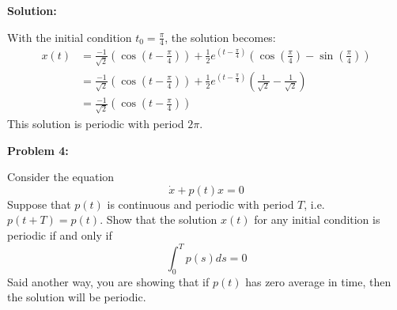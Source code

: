 \documentclass[12pt]{article}
\newenvironment{problem}[1]{
    \textbf{Problem #1:}
}{
    \rmfamily \vspace{1em}
}
\newenvironment{solution}{
    \textbf{Solution:}
    
}{
    
    \vspace{2em}
}
\begin{document}
\begin{solution}
\[    \]
With the initial condition \(t_0 = \frac{\pi}{4}\), the solution becomes:
    \[
        \begin{aligned}
            x(t) &= \frac{-1}{\sqrt{2}} \left(\cos(t-\frac{\pi}{4})\right) + \frac{1}{2}e^{(t-\frac{\pi}{4})} \left(\cos(\frac{\pi}{4})-\sin(\frac{\pi}{4})\right)\\
            &= \frac{-1}{\sqrt{2}} \left(\cos(t-\frac{\pi}{4})\right) + \frac{1}{2}e^{(t-\frac{\pi}{4})} \left(\frac{1}{\sqrt{2}}-\frac{1}{\sqrt{2}}\right)\\
            &= \frac{-1}{\sqrt{2}} \left(\cos(t-\frac{\pi}{4})\right)
        \end{aligned}
    \]
This solution is periodic with period \(2\pi\).
\end{solution}

\begin{problem}{4}
    Consider the equation
        \[
            \dot{x} + p(t)x = 0
        \]
    Suppose that \(p(t)\) is continuous  and periodic with period \(T\), i.e. \(p(t + T) = p(t)\). Show that the solution \(x(t)\) for any initial condition is
    periodic if and only if
    \[
        \int_{0}^T p(s)ds = 0
    \]
    Said another way, you are showing that if \(p(t)\) has zero average in time, then the solution will be periodic.
\end{problem}
\end{document}
